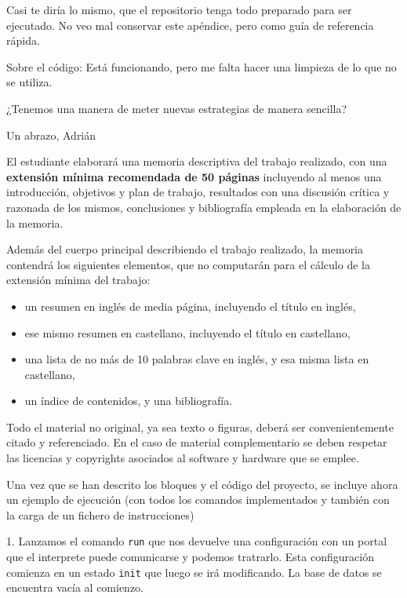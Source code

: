 Casi te diría lo mismo, que el repositorio tenga todo preparado para ser ejecutado. No veo mal
conservar este apéndice, pero como guía de referencia rápida.

Sobre el código:
Está funcionando, pero me falta hacer una limpieza de lo que no se utiliza.

¿Tenemos una manera de meter nuevas estrategias de manera sencilla?

Un abrazo,
 Adrián 
\medskip



El estudiante elaborará una memoria descriptiva del trabajo realizado, con una \textbf{extensión mínima recomendada de 50 páginas} incluyendo al menos una introducción, objetivos y plan de trabajo, resultados con una discusión crítica y razonada de los mismos, conclusiones y bibliografía empleada en la elaboración de la memoria.

Además del cuerpo principal describiendo el trabajo realizado, la memoria contendrá los siguientes elementos, que no computarán para el cálculo de la extensión mínima del trabajo:

\begin{itemize}
\item un resumen en inglés de media página, incluyendo el título en inglés,
\item ese mismo resumen en castellano, incluyendo el título en castellano,
\item una lista de no más de 10 palabras clave en inglés, y esa misma lista en castellano,
\item un índice de contenidos, y una bibliografía.
\end{itemize}

Todo el material no original, ya sea texto o figuras, deberá ser convenientemente citado y referenciado. En el caso de material complementario se deben respetar las licencias y copyrights asociados al software y hardware que se emplee.
\medskip



Una vez que se han descrito los bloques y el código del proyecto, se incluye ahora un ejemplo de ejecución (con todos los comandos implementados y también con la carga de un fichero de instrucciones)
\medskip

1. Lanzamos el comando \texttt{run} que nos devuelve una configuración con un portal que el interprete puede comunicarse y podemos tratrarlo. Esta configuración comienza en un estado \texttt{init} que luego se irá modificando.
La base de datos se encuentra vacía al comienzo.

